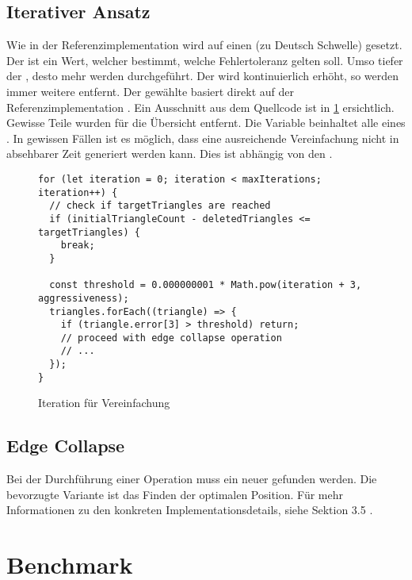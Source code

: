 \subsection{Iterativer Ansatz}

Wie in der Referenzimplementation wird auf einen  (zu Deutsch Schwelle) gesetzt. Der  ist ein Wert, welcher bestimmt, welche Fehlertoleranz gelten soll. Umso tiefer der , desto mehr  werden durchgeführt. Der  wird kontinuierlich erhöht, so werden immer weitere  entfernt. Der gewählte  basiert direkt auf der Referenzimplementation \cite{fastQuadricMeshSimplification}. Ein Ausschnitt aus dem Quellcode ist in \ref{code:thresholdIteration} ersichtlich. Gewisse Teile wurden für die Übersicht entfernt. Die Variable  beinhaltet alle  eines . In gewissen Fällen ist es möglich, dass eine ausreichende Vereinfachung nicht in absehbarer Zeit generiert werden kann. Dies ist abhängig von den .

\begin{figure}[H]
  \begin{lstlisting}[style=JavaScript]
for (let iteration = 0; iteration < maxIterations; iteration++) {
  // check if targetTriangles are reached
  if (initialTriangleCount - deletedTriangles <= targetTriangles) {
    break;
  }

  const threshold = 0.000000001 * Math.pow(iteration + 3, aggressiveness);
  triangles.forEach((triangle) => {
    if (triangle.error[3] > threshold) return;
    // proceed with edge collapse operation
    // ...
  });
}
  \end{lstlisting}
  \caption{Iteration für Vereinfachung}
  \label{code:thresholdIteration}
\end{figure}


\subsection{Edge Collapse}

Bei der Durchführung einer  Operation muss ein neuer  gefunden werden. Die bevorzugte Variante ist das Finden der optimalen Position. Für mehr Informationen zu den konkreten Implementationsdetails, siehe  Sektion 3.5 \cite{quadridBasedSurfaceSimplification}.

\section{Benchmark}

